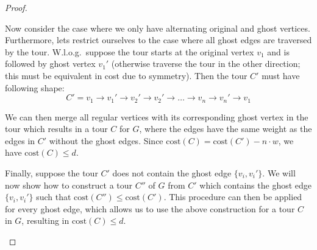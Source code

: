 \documentclass{article}
\begin{document}
\begin{proof}
\begin{itemize}
        Now consider the case where we only have alternating original and ghost vertices. Furthermore, lets restrict ourselves to the case where all ghost edges are traversed by the tour. W.l.o.g.~suppose the tour starts at the original vertex $v_1$ and is followed by ghost vertex $v_1'$ (otherwise traverse the tour in the other direction; this must be equivalent in cost due to symmetry). Then the tour $C'$ must have following shape:
        \[
            C' = v_1 \rightarrow v_1' \rightarrow v_2'\rightarrow v_2' \rightarrow \dots \rightarrow v_n \rightarrow v_n' \rightarrow v_1
        \]
        
        We can then merge all regular vertices with its corresponding ghost vertex in the tour which results in a tour $C$ for $G$, where the edges have the same weight as the edges in $C'$ without the ghost edges. Since $\text{cost}(C) = \text{cost}(C') - n \cdot w$, we have $\text{cost}(C) \le d$.

        Finally, suppose the tour $C'$ does not contain the ghost edge $\{v_i, v_i'\}$. We will now show how to construct a tour $C''$ of $G$ from $C'$ which contains the ghost edge $\{v_i, v_i'\}$ such that $\text{cost}(C'') \le \text{cost}(C')$. This procedure can then be applied for every ghost edge, which allows us to use the above construction for a tour $C$ in $G$, resulting in $\text{cost}(C) \le d$.


\end{itemize}
\end{proof}
\end{document}
